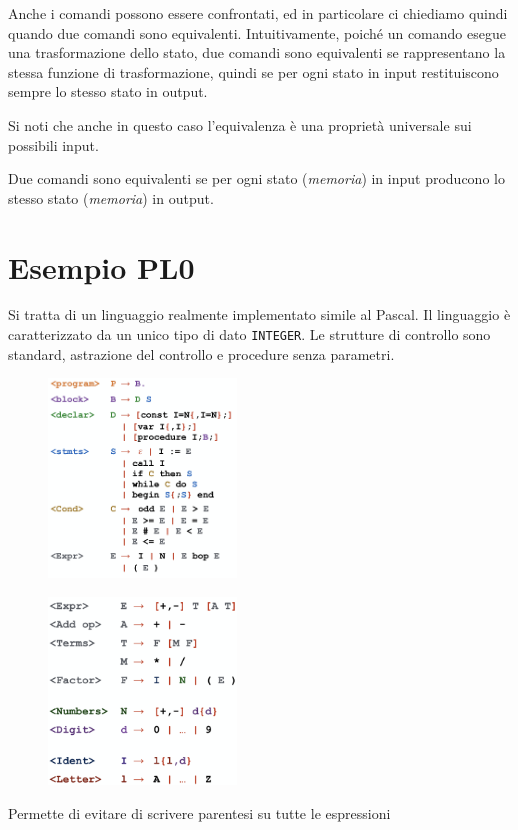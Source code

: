 \documentclass[oneside,a4paper,11pt]{book}
\theoremstyle{italicstyle}
\theoremstyle{normStyle}
\begin{document}
Anche i comandi possono essere confrontati, ed in particolare ci chiediamo
quindi quando due comandi sono equivalenti.
Intuitivamente, poiché un comando esegue una trasformazione dello stato,
due comandi sono equivalenti se rappresentano la stessa funzione di
trasformazione, quindi se per ogni stato in input restituiscono sempre
lo stesso stato in output. 

Si noti che anche in questo caso l’equivalenza
è una proprietà universale sui possibili input. 

\begin{tcolorbox}[title={Equivalenza}]
Due comandi sono equivalenti se per ogni stato
(\textit{memoria}) in input producono lo stesso stato (\textit{memoria}) in output.
\end{tcolorbox}
\section{Esempio PL0}
Si tratta di un linguaggio realmente implementato simile al Pascal. Il 
linguaggio è caratterizzato da un unico tipo di dato \verb|INTEGER|.
Le strutture di controllo sono standard, astrazione del controllo e procedure 
senza parametri.
\begin{figure}[H]
  \centering
  \includegraphics[width=5cm]{img/PL0.png}
  \label{fig:pl0}
\end{figure}
\begin{figure}[H]
  \centering
  \includegraphics[width=5cm]{img/gramm_PL0.png}
  \label{fig:gramm_pl0}
\end{figure}
Permette di evitare di scrivere parentesi su tutte le espressioni
\end{document}
